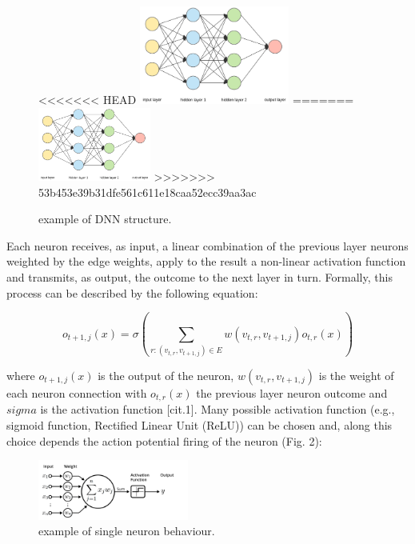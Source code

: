 \documentclass[prl,twocolumn]{revtex4-1}
\begin{document}
\begin{figure}[h]
<<<<<<< HEAD
	\includegraphics[width=0.44\textwidth]{DNN_structure.png}
=======
	\includegraphics[width=0.33\textwidth]{DNN_structure.png}
>>>>>>> 53b453e39b31dfe561c611e18caa52ecc39aa3ac
	\caption{example of DNN structure.}
	\label{fig:y}
\end{figure}

Each neuron receives, as input, a linear combination of the previous layer neurons weighted by the edge weights, apply to the result a non-linear activation function and transmits, as output, the outcome to the next layer in turn. Formally, this process can be described by the following equation:

\begin{equation}
o_{t+1,j}(x) = \sigma \left(\sum_{r:(v_{t,r}, v_{t+1,j}) \in E}w(v_{t,r}, v_{t+1,j})o_{t,r}(x)\right)
\label{eq:simple}
\end{equation}

where \(o_{t+1,j}(x)\) is the output of the neuron, \(w(v_{t,r}, v_{t+1,j})\) is the weight of each neuron connection with \(o_{t,r}(x)\) the previous layer neuron outcome and \(sigma\) is the activation function [cit.1]. Many possible activation function (e.g., sigmoid function, Rectified Linear Unit (ReLU)) can be chosen and, along this choice depends the action potential firing of the neuron (Fig. 2):

\begin{figure}[h]
	\includegraphics[width=0.44\textwidth]{Activation.png}
	\caption{example of single neuron behaviour.}
	\label{fig:y}
\end{figure}
\end{document}
